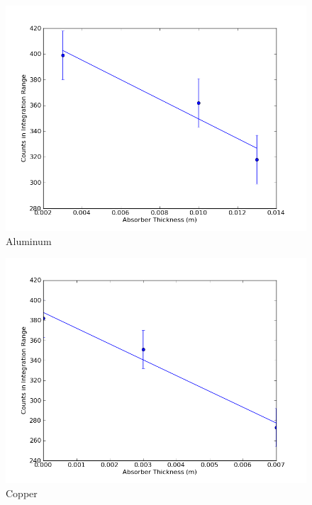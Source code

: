 \documentclass[12pt]{article}
\begin{document}
\begin{figure}[H]
\centering
\hspace{-0.0in}\includegraphics[scale=0.60]{Plot3.png}
\caption{Aluminum \label{fig:setup}}
\end{figure}

\begin{figure}[H]
\centering
\hspace{-0.0in}\includegraphics[scale=0.60]{Plot4.png}
\caption{Copper \label{fig:setup}}
\end{figure}
\end{document}

